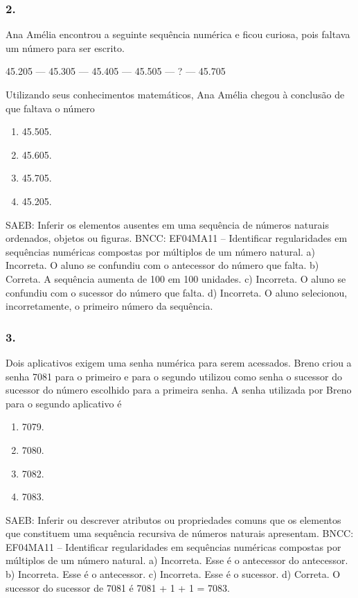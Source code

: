 \begin{enumerate}
\begin{escolha}
\begin{enumerate}
\subsubsection{2.}\label{section-37}

Ana Amélia encontrou a seguinte sequência numérica e ficou curiosa, pois
faltava um número para ser escrito.

45.205 --- 45.305 --- 45.405 --- 45.505 --- ? --- 45.705

Utilizando seus conhecimentos matemáticos, Ana Amélia chegou à conclusão de que
faltava o número

\begin{enumerate}
\def\labelenumi{\alph{enumi})}
\item
  45.505.
\item
  45.605.
\item
  45.705.
\item
  45.205.
\end{enumerate}

SAEB: Inferir os elementos ausentes em uma sequência de números naturais ordenados, objetos ou figuras.
BNCC: EF04MA11 -- Identificar regularidades em sequências numéricas compostas por múltiplos de um
número natural.
a) Incorreta. O aluno se confundiu com o antecessor do número que falta.
b) Correta. A sequência aumenta de 100 em 100 unidades.
c) Incorreta. O aluno se confundiu com o sucessor do número que falta.
d) Incorreta. O aluno selecionou, incorretamente, o primeiro número da sequência.


\subsubsection{3.}\label{section-38}

Dois aplicativos exigem uma senha numérica para serem acessados. Breno
criou a senha 7081 para o primeiro e para o segundo utilizou como senha
o sucessor do sucessor do número escolhido para a primeira senha. A
senha utilizada por Breno para o segundo aplicativo é

\begin{enumerate}
\def\labelenumi{\alph{enumi})}
\item
  7079.
\item
  7080.
\item
  7082.
\item
  7083.
\end{enumerate}

SAEB: Inferir ou descrever atributos ou propriedades comuns que os elementos que constituem uma sequência recursiva de números naturais apresentam.
BNCC: EF04MA11 -- Identificar regularidades em sequências numéricas compostas por múltiplos de um
número natural.
a) Incorreta. Esse é o antecessor do antecessor.
b) Incorreta. Esse é o antecessor.
c) Incorreta. Esse é o sucessor.
d) Correta. O sucessor do sucessor de 7081 é 7081 + 1 + 1 = 7083.



\end{enumerate}
\end{escolha}
\end{enumerate}
